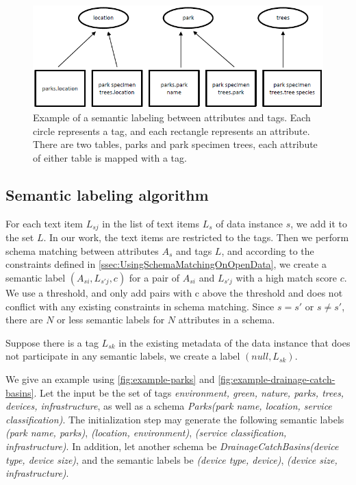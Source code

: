 \begin{figure}
    \centering
    \includegraphics[width=5in]{figures/example-semantic-labeling.png}
    \caption{Example of a semantic labeling between attributes and tags.
    Each circle represents a tag, and each rectangle represents an attribute. There are two tables, parks and park specimen trees, each attribute of either table is mapped with a tag.}
    \label{fig:example-semantic-labeling}
\end{figure}

\subsection{Semantic labeling algorithm}
\label{ssec:SemanticLabelingAlgorithm}

For each text item $L_{sj}$ in the list of text items $L_{s}$ of data instance $s$, we add it to the set $L$. In our work, the text items are restricted to the tags. Then we perform schema matching between attributes $A_{s}$ and tags $L$, and according to the constraints defined in \autoref{ssec:UsingSchemaMatchingOnOpenData}, we create a semantic label $(A_{si},L_{s'j},c)$ for a pair of $A_{si}$ and $L_{s'j}$ with a high match score $c$. We use a threshold, and only add pairs with c above the threshold and does not conflict with any existing constraints in schema matching. Since $s=s'$ or $s\neq s'$, there are $N$ or less semantic labels for $N$ attributes in a schema.

Suppose there is a tag $L_{sk}$ in the existing metadata of the data instance that does not participate in any semantic labels, we create a label $(null,L_{sk})$.

We give an example using \autoref{fig:example-parks} and \autoref{fig:example-drainage-catch-basins}. Let the input be the set of tags \textit{{environment, green, nature, parks, trees, devices, infrastructure}}, as well as a schema \textit{Parks(park name, location, service classification)}. The initialization step may generate the following semantic labels \textit{(park name, parks)}, \textit{(location, environment)}, \textit{(service classification, infrastructure)}. In addition, let another schema be \textit{DrainageCatchBasins(device type, device size)}, and the semantic labels be \textit{(device type, device)}, \textit{(device size, infrastructure)}.

